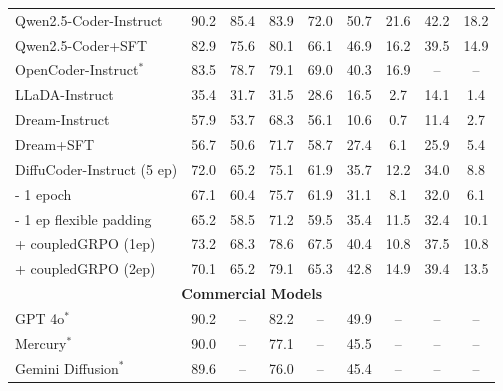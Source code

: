 \begin{table}[t]
\begin{tabular}{@{} l cc cc cc cc @{}}
        \midrule
        \cellcolor{lightRed!12}Qwen2.5-Coder-Instruct & 90.2  & 85.4  & 83.9  & 72.0  & 50.7  & 21.6  & 42.2 & 18.2 \\
        \cellcolor{lightRed!12}Qwen2.5-Coder+SFT      
        & 82.9  
        & 75.6 
        & 80.1  
        & 66.1  
        & 46.9  
        & 16.2  
        & 39.5 & 14.9 \\
        \cellcolor{lightRed!12}OpenCoder-Instruct$^*$      
        & 83.5
        & 78.7
        & 79.1
        & 69.0
        & 40.3
        & 16.9
        & – & – \\
        \cellcolor{lightYellow!12}LLaDA-Instruct        
        & 35.4 
        & 31.7 
        & 31.5  
        & 28.6  
        & 16.5  
        & 2.7  
        & 14.1 & 1.4 \\
    \cellcolor{lightYellow!12}Dream-Instruct        
        & 57.9  
        & 53.7  
        & 68.3  
        & 56.1 
        & 10.6
        & 0.7 
        & 11.4 & 2.7 \\
    \cellcolor{lightYellow!12}Dream+SFT
        & 56.7  
        & 50.6  
        & 71.7  
        & 58.7 
        & 27.4
        & 6.1 
        & 25.9 & 5.4 \\
    \cellcolor{lightYellow!12}DiffuCoder-Instruct (5 ep)  
        & 72.0
        & 65.2
        & 75.1 
        & 61.9  
        & 35.7 
        & 12.2  
        & 34.0 & 8.8 \\
        \quad \cellcolor{lightYellow!5}- 1 epoch            & 67.1	& 60.4	& 75.7&	61.9	&31.1	&8.1&	32.0&	6.1 \\
        \quad \cellcolor{lightYellow!5}- 1 ep flexible padding            & 65.2&	58.5&	71.2&	59.5	&35.4	&11.5&	32.4	&10.1 \\
        \cellcolor{lightYellow!12}\quad + coupledGRPO (1ep)&73.2	&68.3	&78.6&	67.5	&40.4&	10.8	&37.5&	10.8\\
        \cellcolor{lightYellow!5}\quad + coupledGRPO (2ep)&70.1	&65.2	&79.1&	65.3&	42.8&	14.9&39.4	&13.5\\
        \midrule
        \multicolumn{9}{c}{\textbf{Commercial Models}} \\
        \midrule
        \cellcolor{lightRed!12}GPT 4o$^*$             & 90.2  & –     & 82.2  & –     & 49.9  & –   & –  &–\\
        \cellcolor{lightYellow!12}Mercury$^*$             & 90.0    & –     & 77.1  & –      & 45.5  & –   &– &– \\
        \cellcolor{lightYellow!12}Gemini Diffusion$^*$            & 89.6    & –     & 76.0  & –       & 45.4  & –   & – & –\\
        \bottomrule
    \end{tabular}
    \label{tab:fulltab}
\end{table}

